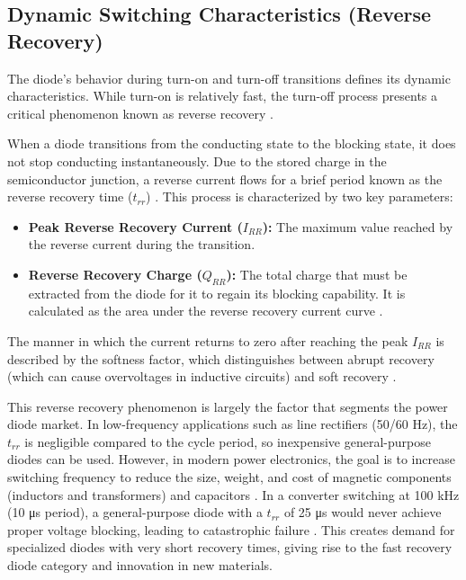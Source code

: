 \documentclass[12pt,a4paper]{article}
\begin{document}
\subsection{Dynamic Switching Characteristics (Reverse Recovery)}

The diode's behavior during turn-on and turn-off transitions defines its dynamic characteristics. While turn-on is relatively fast, the turn-off process presents a critical phenomenon known as reverse recovery \cite{rashid2014, mohan2003}.

When a diode transitions from the conducting state to the blocking state, it does not stop conducting instantaneously. Due to the stored charge in the semiconductor junction, a reverse current flows for a brief period known as the reverse recovery time ($t_{rr}$) \cite{rashid2014, mohan2003}. This process is characterized by two key parameters:

\begin{itemize}
    \item \textbf{Peak Reverse Recovery Current ($I_{RR}$):} The maximum value reached by the reverse current during the transition.
    \item \textbf{Reverse Recovery Charge ($Q_{RR}$):} The total charge that must be extracted from the diode for it to regain its blocking capability. It is calculated as the area under the reverse recovery current curve \cite{rashid2014}.
\end{itemize}

The manner in which the current returns to zero after reaching the peak $I_{RR}$ is described by the softness factor, which distinguishes between abrupt recovery (which can cause overvoltages in inductive circuits) and soft recovery \cite{rashid2014}.

This reverse recovery phenomenon is largely the factor that segments the power diode market. In low-frequency applications such as line rectifiers (50/60 Hz), the $t_{rr}$ is negligible compared to the cycle period, so inexpensive general-purpose diodes can be used. However, in modern power electronics, the goal is to increase switching frequency to reduce the size, weight, and cost of magnetic components (inductors and transformers) and capacitors \cite{rashid2014}. In a converter switching at 100 kHz (10 μs period), a general-purpose diode with a $t_{rr}$ of 25 μs would never achieve proper voltage blocking, leading to catastrophic failure \cite{rashid2014}. This creates demand for specialized diodes with very short recovery times, giving rise to the fast recovery diode category and innovation in new materials.
\end{document}

